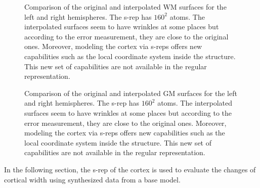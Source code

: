 \documentclass[a4paper,twoside]{article}
\begin{document}
\begin{figure}
 \caption[Comparison of the interpolated and original WM surfaces.]{Comparison of the original and interpolated WM surfaces for the left and right hemispheres.
    The s-rep has $160^2$ atoms. The interpolated surfaces seem to have wrinkles at some places 
              but according to the error measurement, they are close to the original ones. 
                               Moreover, modeling the cortex via s-reps offers new capabilities such as the local coordinate system inside the structure.
                               This new set of capabilities are not available in the regular representation.}
 \label{fig:OriginalCortex}
\end{figure}
\begin{figure} 
 \caption[Comparison of the interpolated and original GM surfaces.]{Comparison of the original and interpolated GM surfaces for the left and right hemispheres.     
  The s-rep has $160^2$ atoms. The interpolated surfaces seem to have wrinkles at some places 
              but according to the error measurement, they are close to the original ones. 
                               Moreover, modeling the cortex via s-reps offers new capabilities such as the local coordinate system inside the structure.
                               This new set of capabilities are not available in the regular representation.}
 \label{fig:InterpolatedCortex}  
\end{figure}

In the following section, the s-rep of the cortex is used to evaluate
the changes of cortical width using synthesized data from a base model. 

\end{document}
